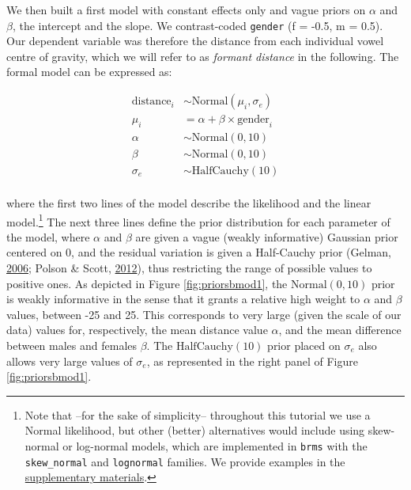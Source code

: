 \documentclass[a4paper,12pt,twoside,onecolumn,openright,final,oldfontcommands]{memoir}
\let\rmarkdownfootnote\footnote%
\def\footnote{\protect\rmarkdownfootnote}
\begin{document}
We then built a first model with constant effects only and vague priors on \(\alpha\) and \(\beta\), the intercept and the slope. We contrast-coded \texttt{gender} (f = -0.5, m = 0.5). Our dependent variable was therefore the distance from each individual vowel centre of gravity, which we will refer to as \emph{formant distance} in the following. The formal model can be expressed as:

\[
\begin{aligned}
\text{distance}_{i} &\sim \mathrm{Normal}(\mu_{i}, \sigma_{e}) \\
\mu_{i} &= \alpha + \beta \times \text{gender}_{i} \\
\alpha &\sim \mathrm{Normal}(0, 10) \\
\beta &\sim \mathrm{Normal}(0, 10) \\
\sigma_{e} &\sim \mathrm{HalfCauchy}(10) \\
\end{aligned}
\]

\vspace{5mm}

where the first two lines of the model describe the likelihood and the linear model.\footnote{Note that --for the sake of simplicity-- throughout this tutorial we use a Normal likelihood, but other (better) alternatives would include using skew-normal or log-normal models, which are implemented in \texttt{brms} with the \texttt{skew\_normal} and \texttt{lognormal} families. We provide examples in the \protect\hyperlink{suppApp}{supplementary materials}.} The next three lines define the prior distribution for each parameter of the model, where \(\alpha\) and \(\beta\) are given a vague (weakly informative) Gaussian prior centered on \(0\), and the residual variation is given a Half-Cauchy prior (Gelman, \protect\hyperlink{ref-gelman_prior_2006}{2006}; Polson \& Scott, \protect\hyperlink{ref-polson_half-cauchy_2012}{2012}), thus restricting the range of possible values to positive ones. As depicted in Figure \ref{fig:priorsbmod1}, the \(\mathrm{Normal}(0,10)\) prior is weakly informative in the sense that it grants a relative high weight to \(\alpha\) and \(\beta\) values, between -25 and 25. This corresponds to very large (given the scale of our data) values for, respectively, the mean distance value \(\alpha\), and the mean difference between males and females \(\beta\). The \(\mathrm{HalfCauchy}(10)\) prior placed on \(\sigma_{e}\) also allows very large values of \(\sigma_{e}\), as represented in the right panel of Figure \ref{fig:priorsbmod1}.
\end{document}

